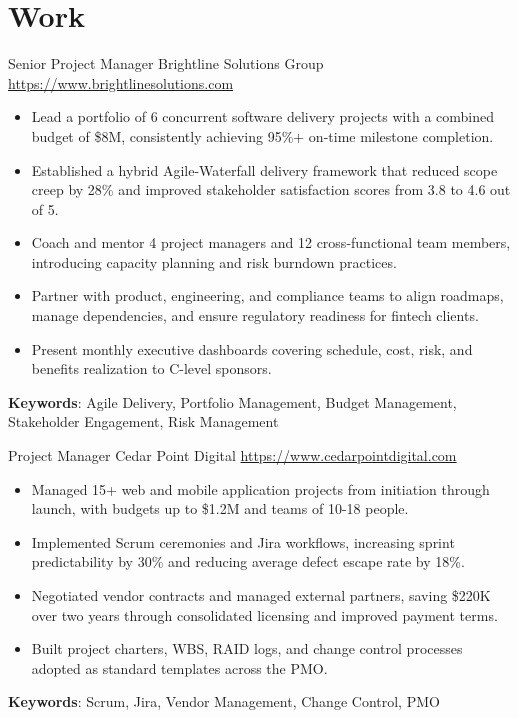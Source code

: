 \documentclass[a4paper, serif, 10pt]{moderncv}
\begin{document}
\section{Work}

        {Senior Project Manager}
        {Brightline Solutions Group}
        {\url{https://www.brightlinesolutions.com}}
        {}
        {\begin{itemize}
\item Lead a portfolio of 6 concurrent software delivery projects with a combined budget of \$8M, consistently achieving 95\%+ on-time milestone completion.
\item Established a hybrid Agile-Waterfall delivery framework that reduced scope creep by 28\% and improved stakeholder satisfaction scores from 3.8 to 4.6 out of 5.
\item Coach and mentor 4 project managers and 12 cross-functional team members, introducing capacity planning and risk burndown practices.
\item Partner with product, engineering, and compliance teams to align roadmaps, manage dependencies, and ensure regulatory readiness for fintech clients.
\item Present monthly executive dashboards covering schedule, cost, risk, and benefits realization to C-level sponsors.
\end{itemize}
\textbf{Keywords}: Agile Delivery, Portfolio Management, Budget Management, Stakeholder Engagement, Risk Management}

        {Project Manager}
        {Cedar Point Digital}
        {\url{https://www.cedarpointdigital.com}}
        {}
        {\begin{itemize}
\item Managed 15+ web and mobile application projects from initiation through launch, with budgets up to \$1.2M and teams of 10-18 people.
\item Implemented Scrum ceremonies and Jira workflows, increasing sprint predictability by 30\% and reducing average defect escape rate by 18\%.
\item Negotiated vendor contracts and managed external partners, saving \$220K over two years through consolidated licensing and improved payment terms.
\item Built project charters, WBS, RAID logs, and change control processes adopted as standard templates across the PMO.
\end{itemize}
\textbf{Keywords}: Scrum, Jira, Vendor Management, Change Control, PMO}
\end{document}
